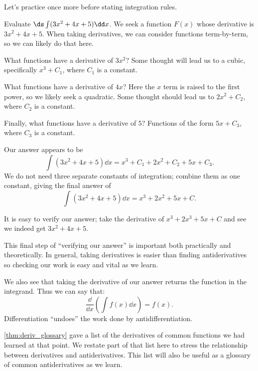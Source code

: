 Let's practice once more before stating integration rules.

\begin{example}\label{ex_anti3}%
Evaluate $\ds \int (3x^2 + 4x+5)\dd x$.
\solution
We seek a function $F(x)$ whose derivative is $3x^2+4x+5$. When taking derivatives, we can consider functions term-by-term, so we can likely do that here.

What functions have a derivative of $3x^2$? Some thought will lead us to a cubic, specifically $x^3+C_1$, where $C_1$ is a constant. 

What functions have a derivative of $4x$? Here the $x$ term is raised to the first power, so we likely seek a quadratic. Some thought should lead us to $2x^2+C_2$, where $C_2$ is a constant.

Finally, what functions have a derivative of $5$? Functions of the form $5x+C_3$, where $C_3$ is a constant.

Our answer appears to be 
\[\int (3x^2+4x+5)\dd x = x^3+C_1+2x^2+C_2+5x+C_3.\]
We do not need three separate constants of integration; combine them as one constant, giving the final answer of 
\[\int (3x^2+4x+5)\dd x = x^3+2x^2+5x+C.\]

It is easy to verify our answer; take the derivative of $x^3+2x^3+5x+C$ and see we indeed get $3x^2+4x+5$.
\end{example}

This final step of ``verifying our answer'' is important both practically and theoretically. In general, taking derivatives is easier than finding antiderivatives so checking our work is easy and vital as we learn.

We also see that taking the derivative of our answer returns the function in the integrand. Thus we can say that:
\[\frac{\dd}{\dd x}\left(\int f(x)\dd x\right) = f(x).\]
Differentiation ``undoes'' the work done by antidifferentiation. 

\autoref{thm:deriv_glossary} gave a list of the derivatives of common functions we had learned at that point. We restate part of that list here to stress the relationship between derivatives and antiderivatives. This list will also be useful as a glossary of common antiderivatives as we learn.

